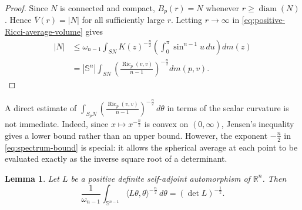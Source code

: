 \documentclass[11pt, reqno]{amsart}
\newtheorem{lemma}{Lemma}
\begin{document}
\begin{proof}
Since $N$ is connected and compact, $B_p(r)=N$ whenever
$r\ge \operatorname{diam}(N)$. Hence $\overline V(r)=|N|$ for all sufficiently large
$r$. Letting $r\to\infty$ in
\eqref{eq:positive-Ricci-average-volume} gives
\begin{align*}
|N|
& \le
\omega_{n-1}\int_{SN}
K(z)^{-\frac n2}
\left(\int_0^\pi\sin^{n-1}u\, du\right)dm(z)\\
& = |\mathbb S^n| \int_{S N}\left(\frac{\operatorname{Ric}_p(v, v)}{n-1}\right)^{-\frac{n}{2}} d m(p, v).
\end{align*}
\end{proof}

A direct estimate of $\int_{S_pN}\left(\frac{\operatorname{Ric}_p(v, v)}{n-1}\right)^{-\frac{n}{2}} \, d\theta$ in terms of the scalar curvature is not immediate. Indeed, since $x\mapsto x^{-\frac{n}{2}}$ is convex on $(0, \infty)$, Jensen's inequality gives a lower bound rather than an upper bound. However, the exponent $-\frac{n}{2}$ in \eqref{eq:spectrum-bound} is special: it allows the spherical average at each point to be evaluated exactly as the inverse square root of a determinant.

\begin{lemma}\label{lem:spherical-det}
Let $L$ be a positive definite self-adjoint automorphism of $\mathbb R^n$. Then
\begin{equation}\label{eq:spherical-det}
\frac{1}{\omega_{n-1}}\int_{\mathbb S^{n-1}}
\langle L\theta, \theta\rangle^{-\frac{n}{2}}\, d\theta
=(\det L)^{-\frac{1}{2}}.
\end{equation}
\end{lemma}
\end{document}
